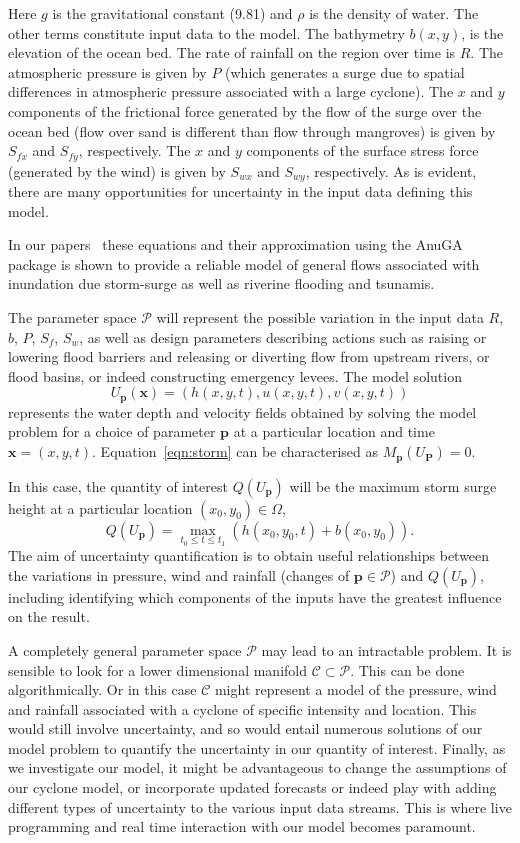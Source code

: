 Here $g$ is the gravitational constant (9.81) and $\rho$ is the density of water. 
The other terms constitute input data to the model. 
The bathymetry $b(x,y)$, is the  elevation of the ocean bed.
The rate of rainfall on the region over time is $R$.
The atmospheric pressure is given by $P$ (which generates a surge due to spatial differences in atmospheric pressure associated with a large cyclone).
The $x$ and $y$ components of the frictional force generated by the flow of the surge over the ocean bed (flow over sand is different than flow through mangroves) is given by $S_{fx}$ and $S_{fy}$, respectively. 
The $x$ and $y$ components of the surface stress force (generated by the wind) is given by $S_{wx}$ and $S_{wy}$, respectively.
As is evident, there are many opportunities for uncertainty in the input  data defining this model. 

In our papers~\parencite{anugamanual,nielsen2005hydrodynamic}  these
equations and their approximation using the  AnuGA package is shown to provide a reliable
model of general flows associated with inundation due storm-surge as well as riverine flooding and tsunamis.

The parameter space $\mathcal{P}$ will represent the possible variation in the input data $R$, $b$, $P$, $S_f$, $S_w$, as well as design parameters describing actions such as raising or lowering flood barriers and releasing or diverting flow from upstream rivers, or flood basins, or indeed constructing emergency levees. 
The model solution 
$$
U_{\mathbf{p}} (\mathbf{x})  = (  h(x,y,t) , u(x,y,t) ,  v(x,y,t) )
$$
represents the water depth and velocity fields obtained by solving the model problem for a choice of parameter $\mathbf{p}$ at a particular location and time $\mathbf{x} = (x,y,t)$.
Equation~\eqref{eqn:storm} can be characterised as $M_{\mathbf{p}}(U_{\mathbf{P}}) = 0$.

In this case, the quantity of interest $Q(U_{\mathbf{p}})$ will be the maximum storm surge height at a particular location $(x_0, y_0) \in \Omega$,
$$ 
Q(U_{\mathbf{p}})  = \max_{t_0 \leq t \leq t_1} \left( h(x_0,y_0,t) + b(x_0,y_0) \right).
$$
The aim of  uncertainty quantification is to obtain useful relationships between the variations in pressure, wind and rainfall (changes of $\mathbf{p} \in \mathcal{P}$) and $Q(U_{\mathbf{p}})$, including identifying which components of the inputs  have the greatest influence on the result. 

A completely general parameter space $\mathcal{P}$ may lead to an intractable problem. It is sensible to look for a lower dimensional manifold $\mathcal{C} \subset \mathcal{P}$. This can be done algorithmically. Or in this case $\mathcal{C}$ might represent a model of the pressure, wind and rainfall associated with a cyclone of specific intensity and location. This would still involve uncertainty, and so would entail numerous solutions of our model problem to quantify the uncertainty in our quantity of interest. Finally, as we investigate our model, it might be advantageous to change the assumptions of our cyclone model, or incorporate updated forecasts or indeed play with adding different types of uncertainty to the various input data streams. This is where live programming and real time interaction with our model becomes paramount. 